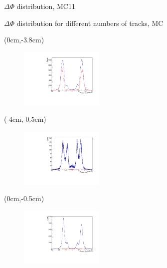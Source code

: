\documentclass[10pt]{beamer}
\begin{document}
{\begin{frame}{$\Delta \Phi$ distribution, MC11}
\begin{textblock*}{0.5\textwidth}
\begin{itemize}
		\end{itemize}
	\end{textblock*}
	

\end{frame}




	

\begin{frame}{$\Delta \Phi$ distribution for different numbers of tracks, MC}
	
	\begin{textblock*}{\textwidth}(0cm,-3.8cm)
		\begin{figure}
			\includegraphics[width=4cm]{Plots/isSignalDeltaPhi}
		
		\end{figure}
	\end{textblock*}

\begin{textblock*}{\textwidth}(-4cm,-0.5cm)
	\begin{figure}
		\includegraphics[width=4cm]{Plots/MCgg}
	\end{figure}
	
\end{textblock*}


\begin{textblock*}{\textwidth}(0cm,-0.5cm)
	\begin{figure}
		\includegraphics[width=4cm]{Plots/MCeg}
	\end{figure}
	
	\end{textblock*}	


\end{frame}}
\end{document}
